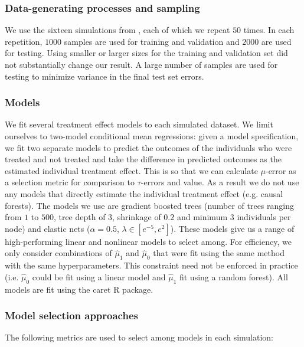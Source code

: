 \subsubsection{Data-generating processes and sampling}

We use the sixteen simulations from \citet{Powers:2017wd}, each of which we repeat $50$ times. In each repetition, $1000$ samples are used for training and validation and $2000$ are used for testing. Using smaller or larger sizes for the training and validation set did not substantially change our result. A large number of samples are used for testing to minimize variance in the final test set errors. 

\subsubsection{Models}

We fit several treatment effect models to each simulated dataset. We limit ourselves to two-model conditional mean regressions: given a model specification, we fit two separate models to predict the outcomes of the individuals who were treated and not treated and take the difference in predicted outcomes as the estimated individual treatment effect. This is so that we can calculate $\mu$-error as a selection metric for comparison to $\tau$-errors and value. As a result we do not use any models that directly estimate the individual treatment effect (e.g. causal forests). The models we use are gradient boosted trees (number of trees ranging from $1$ to $500$, tree depth of $3$, shrinkage of $0.2$ and minimum $3$ individuals per node) and elastic nets ($\alpha=0.5$, $\lambda \in [e^{-5}, e^2]$). These models give us a range of high-performing linear and nonlinear models to select among. For efficiency, we only consider combinations of $\hat\mu_1$ and $\hat\mu_0$ that were fit using the same method with the same hyperparameters. This constraint need not be enforced in practice (i.e. $\hat\mu_0$ could be fit using a linear model and $\hat\mu_1$ fit using a random forest). All models are fit using the caret R package.

\subsubsection{Model selection approaches}

The following metrics are used to select among models in each simulation:

